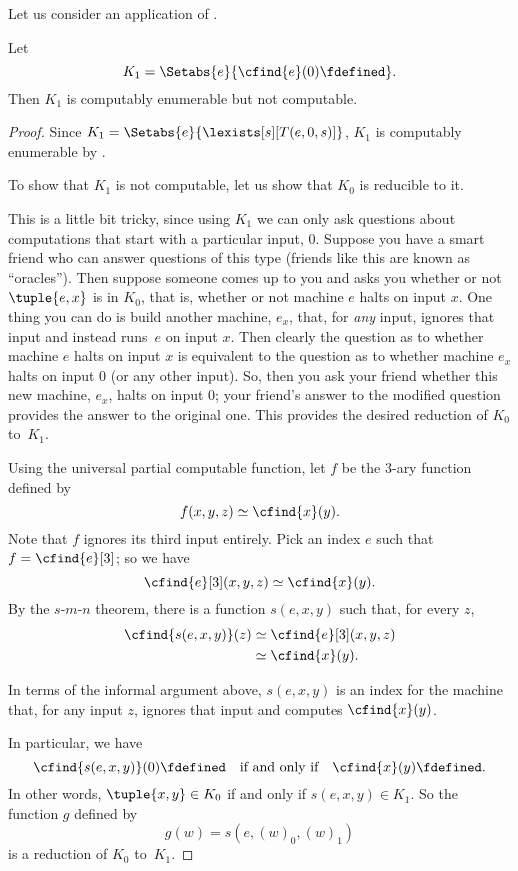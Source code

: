 \documentclass[../../../include/open-logic-section]{subfiles}
\begin{document}

Let us consider an application of .

\begin{prop}
Let
\[
K_1 = \Setabs{e}{\cfind{e}(0) \fdefined}.
\]
Then $K_1$ is computably enumerable but not computable.
\end{prop}

\begin{proof}
Since $K_1 = \Setabs{e}{\lexists[s][T(e,0,s)]}$, $K_1$ is computably
enumerable by .

To show that $K_1$ is not computable, let us show that $K_0$ is
reducible to it.

\begin{explain}
This is a little bit tricky, since using $K_1$ we can
only ask questions about computations that start with a particular
input, $0$. Suppose you have a smart friend who can answer questions
of this type (friends like this are known as ``oracles''). Then
suppose someone comes up to you and asks you whether or not $\tuple{e,
  x}$ is in $K_0$, that is, whether or not machine $e$ halts on input
$x$. One thing you can do is build another machine, $e_x$, that, for
\emph{any} input, ignores that input and instead runs~$e$ on input
$x$. Then clearly the question as to whether machine $e$ halts on
input $x$ is equivalent to the question as to whether machine $e_x$
halts on input $0$ (or any other input). So, then you ask your friend
whether this new machine, $e_x$, halts on input $0$; your friend's
answer to the modified question provides the answer to the original
one. This provides the desired reduction of $K_0$ to~$K_1$.
\end{explain}

Using the universal partial computable function, let $f$
be the 3-ary function defined by
\[
f(x,y,z) \simeq \cfind{x}(y).
\]
Note that $f$ ignores its third input entirely. Pick an index $e$ such
that $f = \cfind{e}[3]$; so we have
\[
\cfind{e}[3](x,y,z) \simeq \cfind{x}(y).
\]
By the $s$-$m$-$n$ theorem, there is a function $s(e,x,y)$ such that, for
every $z$,
\begin{align*}
\cfind{s(e,x,y)}(z) & \simeq \cfind{e}[3](x,y,z) \\
& \simeq \cfind{x}(y).
\end{align*}

\begin{explain}
In terms of the informal argument above, $s(e,x,y)$ is an index for
the machine that, for any input $z$, ignores that input and computes
$\cfind{x}(y)$.
\end{explain}

In particular, we have
\[
\cfind{s(e,x,y)}(0) \fdefined \quad \text{if and only if} \quad
\cfind{x}(y) \fdefined.
\]
In other words, $\tuple{x, y} \in K_0$ if and only if $s(e,x,y) \in
K_1$. So the function $g$ defined by
\[
g(w) = s(e,(w)_0,(w)_1)
\]
is a reduction of $K_0$ to~$K_1$.
\end{proof}
\end{document}
